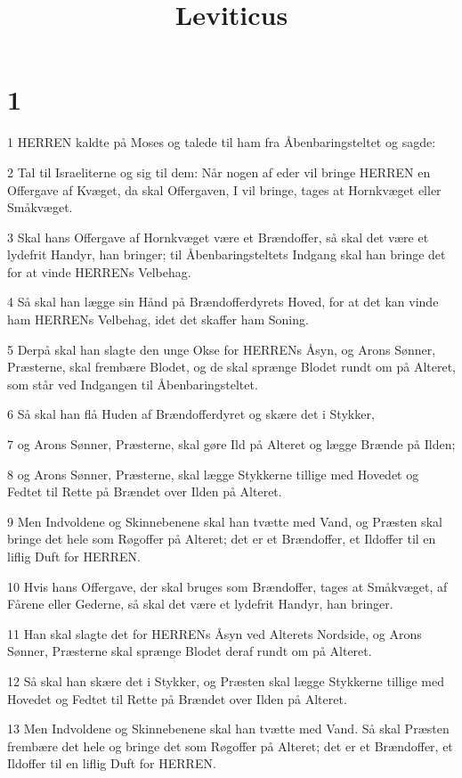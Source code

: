 

\title{Leviticus}


\chapter{1}

\par 1 HERREN kaldte på Moses og talede til ham fra Åbenbaringsteltet og sagde:
\par 2 Tal til Israeliterne og sig til dem: Når nogen af eder vil bringe HERREN en Offergave af Kvæget, da skal Offergaven, I vil bringe, tages at Hornkvæget eller Småkvæget.
\par 3 Skal hans Offergave af Hornkvæget være et Brændoffer, så skal det være et lydefrit Handyr, han bringer; til Åbenbaringsteltets Indgang skal han bringe det for at vinde HERRENs Velbehag.
\par 4 Så skal han lægge sin Hånd på Brændofferdyrets Hoved, for at det kan vinde ham HERRENs Velbehag, idet det skaffer ham Soning.
\par 5 Derpå skal han slagte den unge Okse for HERRENs Åsyn, og Arons Sønner, Præsterne, skal frembære Blodet, og de skal sprænge Blodet rundt om på Alteret, som står ved Indgangen til Åbenbaringsteltet.
\par 6 Så skal han flå Huden af Brændofferdyret og skære det i Stykker,
\par 7 og Arons Sønner, Præsterne, skal gøre Ild på Alteret og lægge Brænde på Ilden;
\par 8 og Arons Sønner, Præsterne, skal lægge Stykkerne tillige med Hovedet og Fedtet til Rette på Brændet over Ilden på Alteret.
\par 9 Men Indvoldene og Skinnebenene skal han tvætte med Vand, og Præsten skal bringe det hele som Røgoffer på Alteret; det er et Brændoffer, et Ildoffer til en liflig Duft for HERREN.
\par 10 Hvis hans Offergave, der skal bruges som Brændoffer, tages at Småkvæget, af Fårene eller Gederne, så skal det være et lydefrit Handyr, han bringer.
\par 11 Han skal slagte det for HERRENs Åsyn ved Alterets Nordside, og Arons Sønner, Præsterne skal sprænge Blodet deraf rundt om på Alteret.
\par 12 Så skal han skære det i Stykker, og Præsten skal lægge Stykkerne tillige med Hovedet og Fedtet til Rette på Brændet over Ilden på Alteret.
\par 13 Men Indvoldene og Skinnebenene skal han tvætte med Vand. Så skal Præsten frembære det hele og bringe det som Røgoffer på Alteret; det er et Brændoffer, et Ildoffer til en liflig Duft for HERREN.
